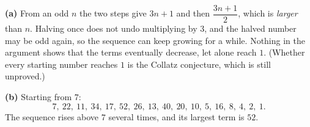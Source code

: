 \textbf{(a)} From an odd $n$ the two steps give $3n+1$ and then $\dfrac{3n+1}{2}$, which is \emph{larger} than $n$. Halving once does not undo multiplying by $3$, and the halved number may be odd again, so the sequence can keep growing for a while. Nothing in the argument shows that the terms eventually decrease, let alone reach $1$. (Whether every starting number reaches $1$ is the Collatz conjecture, which is still unproved.)

\textbf{(b)} Starting from $7$:
\[7,\ 22,\ 11,\ 34,\ 17,\ 52,\ 26,\ 13,\ 40,\ 20,\ 10,\ 5,\ 16,\ 8,\ 4,\ 2,\ 1.\]
The sequence rises above $7$ several times, and its largest term is $\boxed{52}$.
